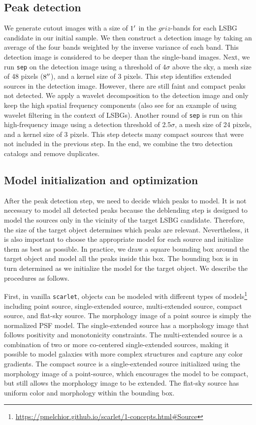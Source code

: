 \documentclass[twocolumn,astrosymb,twocolappendix]{aastex631}
\newcommand{\code}[1]{\texttt{#1}}
\begin{document}
\begin{CJK*}{UTF8}{gbsn}
\subsection{Peak detection}\label{sec:peak}
We generate cutout images with a size of $1\mbox{$^\prime$}$ in the $griz$-bands for each LSBG candidate in our initial sample. We then construct a detection image by taking an average of the four bands weighted by the inverse variance of each band. This detection image is considered to be deeper than the single-band images. 
Next, we run \code{sep} on the detection image using a threshold of 4$\sigma$ above the sky, a mesh size of 48 pixels ($8\mbox{$^{\prime\prime}$}$), and a kernel size of 3 pixels. This step identifies extended sources in the detection image. However, there are still faint and compact peaks not detected. We apply a wavelet decomposition to the detection image \citep{Starck2015} and only keep the high spatial frequency components (also see \citealt{Zaritsky2019} for an example of using wavelet filtering in the context of LSBGs). Another round of \code{sep} is run on this high-frequency image using a detection threshold of 2.5$\sigma$, a mesh size of 24 pixels, and a kernel size of 3 pixels. This step detects many compact sources that were not included in the previous step. In the end, we combine the two detection catalogs and remove duplicates. 

\subsection{Model initialization and optimization}
After the peak detection step, we need to decide which peaks to model. It is not necessary to model all detected peaks because the deblending step is designed to model the sources only in the vicinity of the target LSBG candidate. Therefore, the size of the target object determines which peaks are relevant. Nevertheless, it is also important to choose the appropriate model for each source and initialize them as best as possible. In practice, we draw a square bounding box around the target object and model all the peaks inside this box. The bounding box is in turn determined as we initialize the model for the target object. We describe the procedures as follows. 

First, in vanilla \code{scarlet}, objects can be modeled with different types of models\footnote{\url{https://pmelchior.github.io/scarlet/1-concepts.html\#Source}} including point source, single-extended source, multi-extended source, compact source, and flat-sky source. The morphology image of a point source is simply the normalized PSF model. The single-extended source has a morphology image that follows positivity and monotonicity constraints. The multi-extended source is a combination of two or more co-centered single-extended sources, making it possible to model galaxies with more complex structures and capture any color gradients. The compact source is a single-extended source initialized using the morphology image of a point-source, which encourages the model to be compact, but still allows the morphology image to be extended. The flat-sky source has uniform color and morphology within the bounding box.


\end{CJK*}
\end{document}
